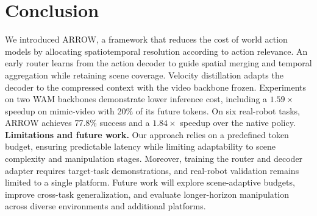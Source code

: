 \section{Conclusion}
\label{sec:conclusion}

We introduced ARROW, a framework that reduces the cost of world action models by allocating spatiotemporal resolution according to action relevance. An early router learns from the action decoder to guide spatial merging and temporal aggregation while retaining scene coverage. Velocity distillation adapts the decoder to the compressed context with the video backbone frozen. Experiments on two WAM backbones demonstrate lower inference cost, including a \(1.59\times\) speedup on mimic-video with 20\% of its future tokens. On six real-robot tasks, ARROW achieves 77.8\% success and a \(1.84\times\) speedup over the native policy.\\

\noindent\textbf{Limitations and future work.}
Our approach relies on a predefined token budget, ensuring predictable latency while limiting adaptability to scene complexity and manipulation stages. Moreover, training the router and decoder adapter requires target-task demonstrations, and real-robot validation remains limited to a single platform. Future work will explore scene-adaptive budgets, improve cross-task generalization, and evaluate longer-horizon manipulation across diverse environments and additional platforms.